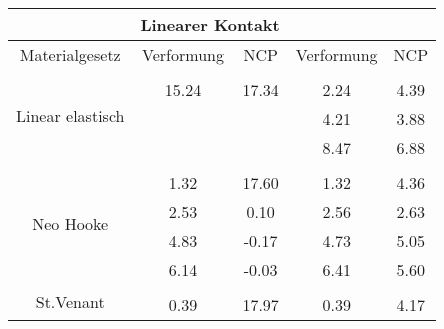 \begin{table} 
\centering 
\begin{tabular}{c|cc|cc|} 
\cline{2-5} 
 & \multicolumn{2}{|c|}{Linearer Kontakt} &  \\ 
\hline 
\multicolumn{1}{|c|}{Materialgesetz} & \multicolumn{1}{c|}{Verformung} & \multicolumn{1}{c|}{NCP} & \multicolumn{1}{c|}{Verformung} & \multicolumn{1}{c|}{NCP} \\ 
\hline 
\multicolumn{1}{|c|}{\multirow{4}{*}{Linear elastisch}} &\multicolumn{1}{|c|}{} & \multicolumn{1}{|c|}{} & \multicolumn{1}{|c|}{} & \multicolumn{1}{|c|}{} \\ 
\multicolumn{1}{|c|}{} & \multicolumn{1}{|c|}{     15.24} & \multicolumn{1}{|c|}{     17.34} & \multicolumn{1}{|c|}{      2.24} & \multicolumn{1}{|c|}{      4.39} \\ 
\multicolumn{1}{|c|}{} & \multicolumn{1}{|c|}{} & \multicolumn{1}{|c|}{} & \multicolumn{1}{|c|}{      4.21} & \multicolumn{1}{|c|}{      3.88} \\ 
\multicolumn{1}{|c|}{} & \multicolumn{1}{|c|}{} & \multicolumn{1}{|c|}{} & \multicolumn{1}{|c|}{      8.47} & \multicolumn{1}{|c|}{      6.88} \\ 
\hline 
\multicolumn{1}{|c|}{\multirow{5}{*}{Neo Hooke}} &\multicolumn{1}{|c|}{} & \multicolumn{1}{|c|}{} & \multicolumn{1}{|c|}{} & \multicolumn{1}{|c|}{} \\ 
\multicolumn{1}{|c|}{} & \multicolumn{1}{|c|}{      1.32} & \multicolumn{1}{|c|}{     17.60} & \multicolumn{1}{|c|}{      1.32} & \multicolumn{1}{|c|}{      4.36} \\ 
\multicolumn{1}{|c|}{} & \multicolumn{1}{|c|}{      2.53} & \multicolumn{1}{|c|}{      0.10} & \multicolumn{1}{|c|}{      2.56} & \multicolumn{1}{|c|}{      2.63} \\ 
\multicolumn{1}{|c|}{} & \multicolumn{1}{|c|}{      4.83} & \multicolumn{1}{|c|}{     -0.17} & \multicolumn{1}{|c|}{      4.73} & \multicolumn{1}{|c|}{      5.05} \\ 
\multicolumn{1}{|c|}{} & \multicolumn{1}{|c|}{      6.14} & \multicolumn{1}{|c|}{     -0.03} & \multicolumn{1}{|c|}{      6.41} & \multicolumn{1}{|c|}{      5.60} \\ 
\hline 
\multicolumn{1}{|c|}{\multirow{6}{*}{St.Venant}} &\multicolumn{1}{|c|}{} & \multicolumn{1}{|c|}{} & \multicolumn{1}{|c|}{} & \multicolumn{1}{|c|}{} \\ 
\multicolumn{1}{|c|}{} & \multicolumn{1}{|c|}{      0.39} & \multicolumn{1}{|c|}{     17.97} & \multicolumn{1}{|c|}{      0.39} & \multicolumn{1}{|c|}{      4.17} \\ 

\end{tabular}
\end{table}
